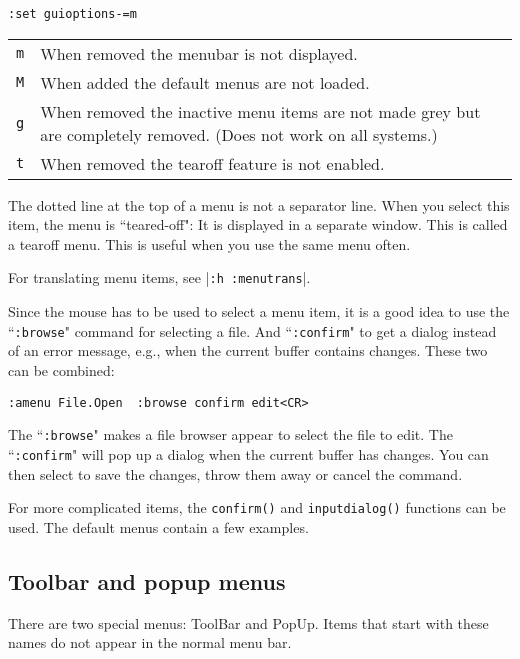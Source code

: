 \begin{Verbatim}[samepage=true]
 :set guioptions-=m
\end{Verbatim}
 
\begin{center} \begin{tabularx} {0.75\textwidth} {l X}
				\texttt{m} & When removed the menubar is not displayed. \\
				\texttt{M} & When added the default menus are not loaded. \\
				\texttt{g} & When removed the inactive menu items are not made grey but are completely removed.  (Does not work on all systems.) \\
				\texttt{t} & When removed the tearoff feature is not enabled. \\
\end{tabularx} \end{center}

The dotted line at the top of a menu is not a separator line.
When you select this item, the menu is ``teared-off": It is displayed in a separate window.
This is called a tearoff menu.
This is useful when you use the same menu often.

For translating menu items, see |\texttt{:h :menutrans}|.

Since the mouse has to be used to select a menu item, it is a good idea to use the ``\texttt{:browse}" command for selecting a file.
And ``\texttt{:confirm}" to get a dialog instead of an error message, e.g., when the current buffer contains changes.
These two can be combined:

\begin{Verbatim}[samepage=true]
 :amenu File.Open  :browse confirm edit<CR>
\end{Verbatim}

The ``\texttt{:browse}" makes a file browser appear to select the file to edit.
The ``\texttt{:confirm}" will pop up a dialog when the current buffer has changes.
You can then select to save the changes, throw them away or cancel the command.

For more complicated items, the \texttt{confirm()} and \texttt{inputdialog()} functions can be used.
The default menus contain a few examples.
\subsection{Toolbar and popup menus}
There are two special menus: ToolBar and PopUp.
Items that start with these names do not appear in the normal menu bar.

